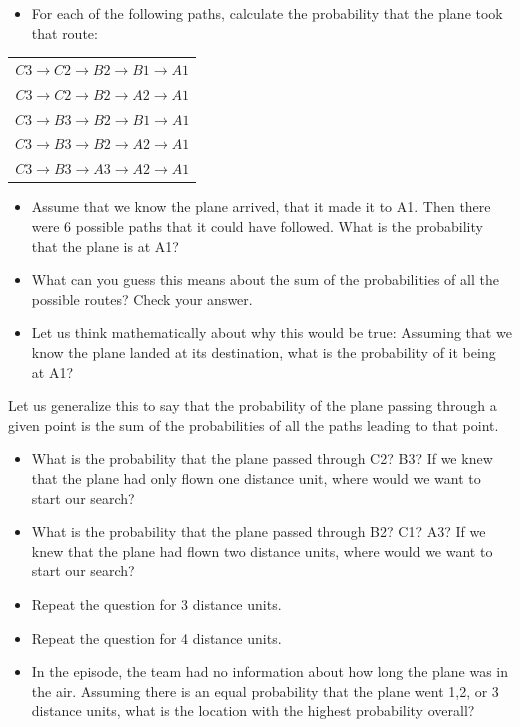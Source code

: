 \begin{itemize}
\item For each of the following paths, calculate the probability that the plane took that route:
\end{itemize}


	\begin{table}[H]
	\centering
	\begin{tabular}{c}
	$C3 \to C2 \to B2 \to B1 \to A1$ \\
	$C3 \to C2 \to B2 \to A2 \to A1$ \\
	$C3 \to B3 \to B2 \to B1 \to A1$ \\
	$C3 \to B3 \to B2 \to A2 \to A1$ \\
	$C3 \to B3 \to A3 \to A2 \to A1$ \\
	\end{tabular}
	\end{table}


\begin{itemize}
\item Assume that we know the plane arrived, that it made it to A1. Then there were 6 possible paths that it could have followed. What is the probability that the plane is at A1?
\item What can you guess this means about the sum of the probabilities of all the possible routes? Check your answer.
\item Let us think mathematically about why this would be true: Assuming that we know the plane landed at its destination, what is the probability of it being at A1?
\end{itemize}


Let us generalize this to say that the probability of the plane passing through a given point is the sum of the probabilities of all the paths leading to that point.


\begin{itemize}
\item What is the probability that the plane passed through C2? B3? If we knew that the plane had only flown one distance unit, where would we want to start our search?
\item What is the probability that the plane passed through B2? C1? A3? If we knew that the plane had flown two distance units, where would we want to start our search?
\item Repeat the question for 3 distance units.
\item Repeat the question for 4 distance units.
\item In the episode, the team had no information about how long the plane was in the air. Assuming there is an equal probability that the plane went 1,2, or 3 distance units, what is the location with the highest probability overall?
\end{itemize}


